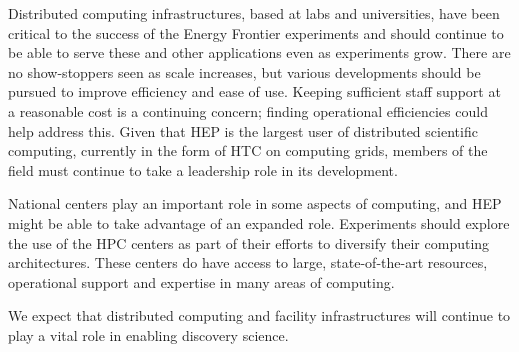 Distributed computing infrastructures, based at labs and universities, have been critical to the success of the Energy Frontier experiments and should continue to be able to serve these and other applications even as experiments grow.  There are no show-stoppers seen as scale increases, but various developments should be pursued to improve efficiency and ease of use.  Keeping sufficient staff support at a reasonable cost is a continuing concern; finding operational efficiencies could help address this.  Given that HEP is the largest user of distributed scientific computing, currently in the form of HTC on computing grids, members of the field must continue to take a leadership role in its development.

National centers play an important role in some aspects of computing, and HEP might be able to take advantage of an expanded role.  Experiments should explore the use of the HPC centers as part of their efforts to diversify their computing architectures.  These centers do have access to large, state-of-the-art resources, operational support and expertise in many areas of computing.

We expect that distributed computing and facility infrastructures will continue to play a vital role in enabling discovery science.

